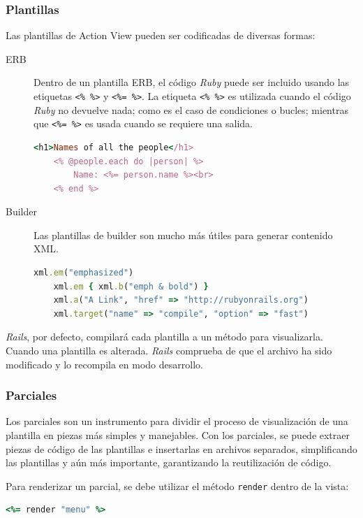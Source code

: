 \subsubsection{Plantillas}
Las plantillas de Action View pueden ser codificadas de diversas formas:

\begin{description}
	\item[ERB] Dentro de un plantilla ERB, el código \textit{Ruby} puede ser incluido usando las etiquetas \texttt{<\% \%>} y \texttt{<\%= \%>}. La etiqueta \texttt{<\% \%>} es utilizada cuando el código \textit{Ruby} no devuelve nada; como es el caso de condiciones o bucles; mientras que \texttt{<\%= \%>} es usada cuando se requiere una salida.
	\begin{lstlisting}[language=Ruby]
	<h1>Names of all the people</h1>
	<% @people.each do |person| %>
  		Name: <%= person.name %><br>
	<% end %>
	\end{lstlisting}
	
	\item[Builder] Las plantillas de builder son mucho más útiles para generar contenido XML.
	\begin{lstlisting}[language=Ruby]
	xml.em("emphasized")
	xml.em { xml.b("emph & bold") }
	xml.a("A Link", "href" => "http://rubyonrails.org")
	xml.target("name" => "compile", "option" => "fast")
	\end{lstlisting} 	
\end{description} 

\textit{Rails}, por defecto, compilará cada plantilla a un método para visualizarla. Cuando una plantilla es alterada. \textit{Rails} comprueba de que el archivo ha sido modificado y lo recompila en modo desarrollo.

\subsubsection{Parciales}
Los parciales son un instrumento para dividir el proceso de visualización de una plantilla en piezas más simples y manejables. Con los parciales, se puede extraer piezas de código de las plantillas e insertarlas en archivos separados, simplificando las plantillas y aún más importante, garantizando la reutilización de código.

Para renderizar un parcial, se debe utilizar el método \texttt{render} dentro de la vista:

\begin{lstlisting}[language=Ruby]
<%= render "menu" %>
\end{lstlisting}

